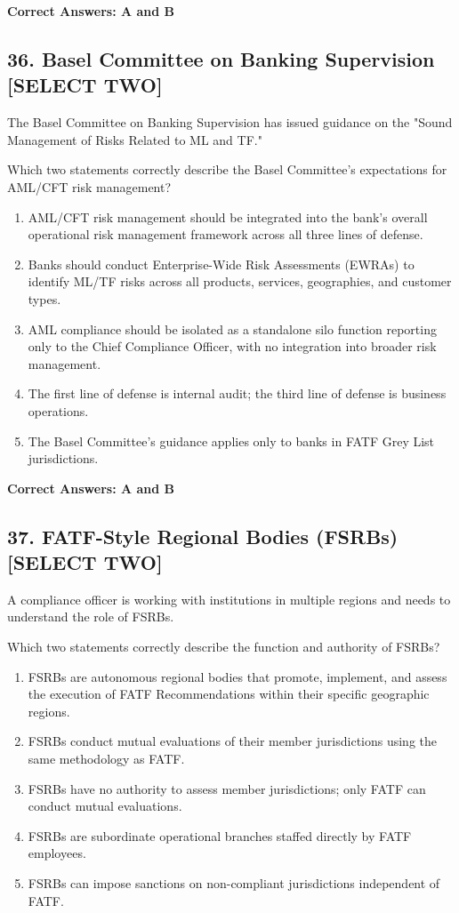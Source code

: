 \documentclass[11pt,a4paper]{article}
\begin{document}
	\textbf{Correct Answers: A and B}
	
	\subsection{36. Basel Committee on Banking Supervision \textnormal{[SELECT TWO]}}
	
	The Basel Committee on Banking Supervision has issued guidance on the "Sound Management of Risks Related to ML and TF."
	
	Which two statements correctly describe the Basel Committee's expectations for AML/CFT risk management?
	
	\begin{enumerate}[label=\Alph*.]
		\item AML/CFT risk management should be integrated into the bank's overall operational risk management framework across all three lines of defense.
		\item Banks should conduct Enterprise-Wide Risk Assessments (EWRAs) to identify ML/TF risks across all products, services, geographies, and customer types.
		\item AML compliance should be isolated as a standalone silo function reporting only to the Chief Compliance Officer, with no integration into broader risk management.
		\item The first line of defense is internal audit; the third line of defense is business operations.
		\item The Basel Committee's guidance applies only to banks in FATF Grey List jurisdictions.
	\end{enumerate}
	
	\textbf{Correct Answers: A and B}
	
	\subsection{37. FATF-Style Regional Bodies (FSRBs) \textnormal{[SELECT TWO]}}
	
	A compliance officer is working with institutions in multiple regions and needs to understand the role of FSRBs.
	
	Which two statements correctly describe the function and authority of FSRBs?
	
	\begin{enumerate}[label=\Alph*.]
		\item FSRBs are autonomous regional bodies that promote, implement, and assess the execution of FATF Recommendations within their specific geographic regions.
		\item FSRBs conduct mutual evaluations of their member jurisdictions using the same methodology as FATF.
		\item FSRBs have no authority to assess member jurisdictions; only FATF can conduct mutual evaluations.
		\item FSRBs are subordinate operational branches staffed directly by FATF employees.
		\item FSRBs can impose sanctions on non-compliant jurisdictions independent of FATF.
	\end{enumerate}
	
\end{document}
